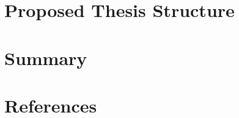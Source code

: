 \documentclass[12pt, twoside]{article}
\begin{document}
\section{Proposed Thesis Structure}
\section{Summary}

\section{References}
\end{document}
